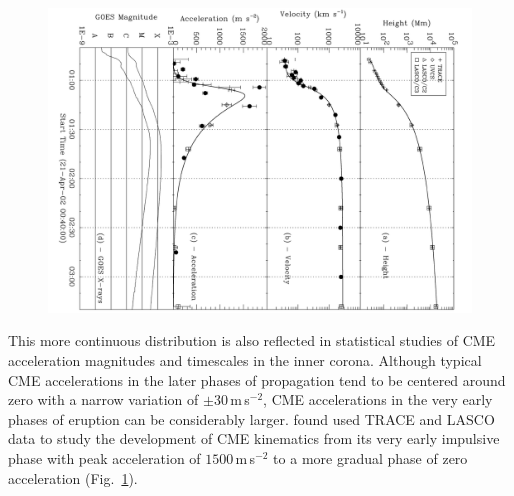\begin{figure}[t!]
\begin{center}
\includegraphics[scale=0.4, angle=90]{images/gall_kins2003}
\caption{\citet{gallagher03}}
\end{center}
\label{fig:gall2003}
\end{figure}
This more continuous distribution is also reflected in statistical studies of CME acceleration magnitudes and timescales in the inner corona. Although typical CME accelerations in the later phases of propagation tend to be centered around zero with a narrow variation of $\pm30$\,m\,s$^{-2}$, CME accelerations in the very early phases of eruption can be considerably larger. \citet{gallagher03} found used TRACE and LASCO data to study the development of CME kinematics from its very early impulsive phase with peak acceleration of $1500$\,m\,s$^{-2}$ to a more gradual phase of zero acceleration (Fig.~\ref{fig:gall2003}). 


